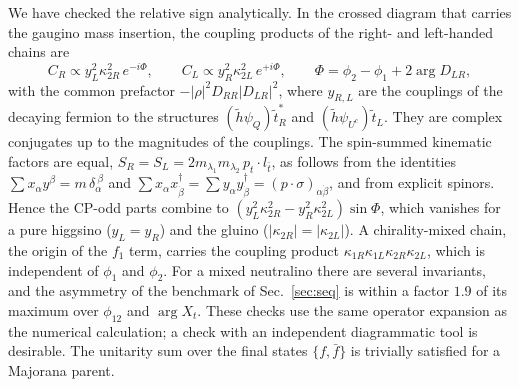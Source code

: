 \documentclass[11pt]{article}
\begin{document}
We have checked the relative sign analytically. In the crossed diagram that carries the gaugino mass insertion, the coupling products of the right- and left-handed chains are
\begin{equation}
C_R\propto y_L^2\kappa_{2R}^2\,e^{-i\Phi},\qquad C_L\propto y_R^2\kappa_{2L}^2\,e^{+i\Phi},\qquad\Phi=\phi_2-\phi_1+2\arg D_{LR},
\end{equation}
with the common prefactor $-|\rho|^2D_{RR}|D_{LR}|^2$, where $y_{R,L}$ are the couplings of the decaying fermion to the structures $(\tilde h\psi_Q)\tilde t_R^*$ and $(\tilde h\psi_{U^c})\tilde t_L$. They are complex conjugates up to the magnitudes of the couplings. The spin-summed kinematic factors are equal, $S_R=S_L=2m_{\lambda_1}m_{\lambda_2}\,p_t\!\cdot l_{\bar t}$, as follows from the identities $\sum x_\alpha y^\beta=m\,\delta_\alpha^{\ \beta}$ and $\sum x_\alpha x^\dagger_{\dot\beta}=\sum y_\alpha y^\dagger_{\dot\beta}=(p\cdot\sigma)_{\alpha\dot\beta}$, and from explicit spinors. Hence the CP-odd parts combine to $(y_L^2\kappa_{2R}^2-y_R^2\kappa_{2L}^2)\sin\Phi$, which vanishes for a pure higgsino ($y_L=y_R$) and the gluino ($|\kappa_{2R}|=|\kappa_{2L}|$). A chirality-mixed chain, the origin of the $f_1$ term, carries the coupling product $\kappa_{1R}\kappa_{1L}\kappa_{2R}\kappa_{2L}$, which is independent of $\phi_1$ and $\phi_2$. For a mixed neutralino there are several invariants, and the asymmetry of the benchmark of Sec.~\ref{sec:seq} is within a factor $1.9$ of its maximum over $\phi_{12}$ and $\arg X_t$. These checks use the same operator expansion as the numerical calculation; a check with an independent diagrammatic tool is desirable. The unitarity sum over the final states $\{f,\bar f\}$ is trivially satisfied for a Majorana parent.
\end{document}
